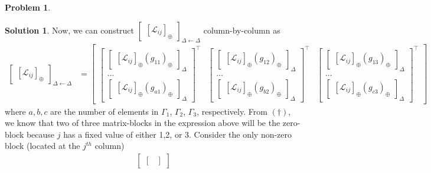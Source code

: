 \documentclass{book}
\theoremstyle{definition}
\newtheorem*{prob*}{Problem}
\newtheorem*{sln*}{Solution}
\newcommand{\lag}{\mathcal{L}}
\begin{document}
\begin{prob*}
\begin{sln*}
	Now, we can construct $\begin{bmatrix}[\lag_{ij}]_\oplus\end{bmatrix}_{\Delta\leftarrow\Delta}$ column-by-column as
	\begin{align*}
	\begin{bmatrix}[\lag_{ij}]_\oplus\end{bmatrix}_{\Delta\leftarrow\Delta}
	&=
	\begin{bmatrix}
	\begin{bmatrix}
	\begin{bmatrix}
	[\lag_{ij}]_\oplus(g_{11})_\oplus
	\end{bmatrix}_\Delta
	\\\dots\\
	\begin{bmatrix}
	[\lag_{ij}]_\oplus(g_{a1})_\oplus
	\end{bmatrix}_\Delta
	\end{bmatrix}^\top
	&
	\begin{bmatrix}
	\begin{bmatrix}
	[\lag_{ij}]_\oplus(g_{12})_\oplus
	\end{bmatrix}_\Delta
	\\\dots\\
	\begin{bmatrix}
	[\lag_{ij}]_\oplus(g_{b2})_\oplus
	\end{bmatrix}_\Delta
	\end{bmatrix}^\top
	&
	\begin{bmatrix}
	\begin{bmatrix}
	[\lag_{ij}]_\oplus(g_{13})_\oplus
	\end{bmatrix}_\Delta
	\\\dots\\
	\begin{bmatrix}
	[\lag_{ij}]_\oplus(g_{c3})_\oplus
	\end{bmatrix}_\Delta
	\end{bmatrix}^\top
	\end{bmatrix}
	\end{align*}
	where $a,b,c$ are the number of elements in $\Gamma_1$, $\Gamma_2$, $\Gamma_3$, respectively. From $(\dagger)$, we know that two of three matrix-blocks in the expression above will be the zero-block because $j$ has a fixed value of either 1,2, or 3. Consider the only non-zero block (located at the $j^{th}$ column)
	\begin{align*}
	\begin{bmatrix}
	\begin{bmatrix}

\end{bmatrix}
\end{bmatrix}
\end{align*}
\end{sln*}
\end{prob*}
\end{document}
